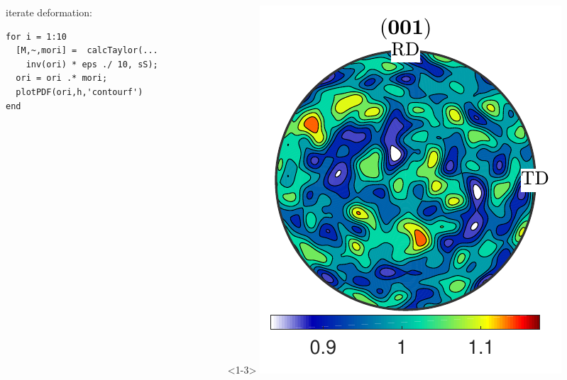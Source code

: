 \documentclass[compress]{beamer}
\begin{document}
\begin{frame}[fragile]
\begin{columns}
\begin{column}{0.7\textwidth}
\begin{overlayarea}{\textwidth}{8cm}
\pause

iterate deformation:
\vspace{-0.2cm}
      \begin{lstlisting}[style=input]
for i = 1:10
  [M,~,mori] =  calcTaylor(...
    inv(ori) * eps ./ 10, sS);
  ori = ori .* mori;
  plotPDF(ori,h,'contourf')
end
\end{lstlisting}

\end{overlayarea}
\end{column}
    \begin{column}{0.29\textwidth}
      \vspace{-1cm}
      \begin{onlyenv}<1-3>
        \includegraphics[width=\textwidth]{pic/rolling001}


\end{onlyenv}
\end{column}
\end{columns}
\end{frame}
\end{document}

